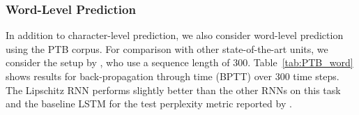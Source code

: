 \documentclass{article} \usepackage{iclr2021_conference,times}
\begin{document}
\begin{table}[!h]
	\caption{Evaluation accuracy on PTB for character-level prediction for different sequence lengths $T$.  The * indicate results that were adopted from \citet{kerg2019non}.}
	\label{tab:PTB_character}
	\centering
\end{table}



\subsubsection{Word-Level Prediction}\label{sec:ptb_word}

In addition to character-level prediction, we also consider word-level prediction using the PTB corpus.
For comparison with other state-of-the-art units, we consider the setup by \citet{kusupati2018fastgrnn}, who use a sequence length of $300$.
Table~\ref{tab:PTB_word} shows results for back-propagation through time (BPTT) over 300 time steps. The Lipschitz RNN performs slightly better than the other RNNs on this task and the baseline LSTM for the test perplexity metric reported by \citet{kusupati2018fastgrnn}. 
\end{document}
